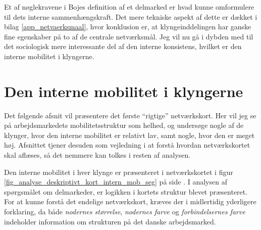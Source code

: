 Et af nøglekravene i Bojes definition af et delmarked er hvad kunne omformulere til dets interne sammenhængskraft. Det mere tekniske aspekt af dette er dækket i bilag \ref{app_netvaerksmaal}, hvor konklusion er, at klyngeinddelingen har ganske fine egenskaber på to af de centrale netværksmål. Jeg vil nu gå i dybden med til det sociologisk mere interessante del af den interne konsistens, hvilket er den interne mobilitet i klyngerne.





\section{Den interne mobilitet i klyngerne \label{analyse_deskriptivt_within_mob_seg}}


Det følgende afsnit vil præsentere det første “rigtige” netværkskort. Her vil jeg se på arbejdsmarkedets mobilitetsstruktur som helhed, og undersøge nogle af de klynger, hvor den interne mobilitet er relativt lav, samt nogle, hvor den er meget høj. Afsnittet tjener desuden som vejledning i at forstå hvordan netværkskortet skal aflæses, så det nemmere kan tolkes i resten af analysen.




Den interne mobilitet i hver klynge er præsenteret i netværkskortet i figur \ref{fig_analyse_deskriptivt_kort_intern_mob_seg} på side . I analysen af spørgsmålet om delmarkeder, er logikken i kortets struktur blevet præsenteret. For at kunne forstå det endelige netværkskort, kræves der i midlertidig yderligere forklaring, da både \emph{nodernes størrelse}, \emph{nodernes farve} og \emph{forbindelsernes farve} indeholder information om strukturen på det danske arbejdsmarked.

